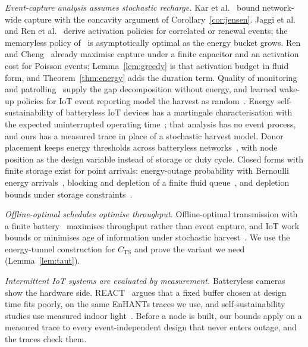 \emph{Event-capture analysis assumes stochastic recharge.} Kar et al.~\cite{kar2006ton} bound network-wide capture with the concavity argument of Corollary~\ref{cor:jensen}. Jaggi et al.~\cite{jaggi2009wn} and Ren et al.~\cite{ren2014tpds,ren2015p2p} derive activation policies for correlated or renewal events; the memoryless policy of~\cite{jaggi2009wn} is asymptotically optimal as the energy bucket grows. Ren and Cheng~\cite{ren2015p2p} already maximise capture under a finite capacitor and an activation cost for Poisson events; Lemma~\ref{lem:greedy} is that activation budget in fluid form, and Theorem~\ref{thm:energy} adds the duration term. Quality of monitoring~\cite{yau2010tosn} and patrolling~\cite{lin2013opre} supply the gap decomposition without energy, and learned wake-up policies for IoT event reporting model the harvest as random~\cite{ruizguirola2026iotj}. Energy self-sustainability of batteryless IoT devices has a martingale characterisation with the expected uninterrupted operating time~\cite{fan2025tgcn}; that analysis has no event process, and ours has a measured trace in place of a stochastic harvest model. Donor placement keeps energy thresholds across batteryless networks~\cite{hammoud2026tgcn}, with node position as the design variable instead of storage or duty cycle. Closed forms with finite storage exist for point arrivals: energy-outage probability with Bernoulli energy arrivals~\cite{ballestrin2026cl}, blocking and depletion of a finite fluid queue~\cite{deepak2026mcap}, and depletion bounds under storage constraints~\cite{yan2024iotj}.

\emph{Offline-optimal schedules optimise throughput.} Offline-optimal transmission with a finite battery~\cite{tutuncuoglu2012twc,yang2012tcom} maximises throughput rather than event capture, and IoT work bounds or minimises age of information under stochastic harvest~\cite{lei2025iotj,botirov2026iotj,hatami2025tgcn}. We use the energy-tunnel construction for $C_{\mathrm{TS}}$ and prove the variant we need (Lemma~\ref{lem:taut}).

\emph{Intermittent IoT systems are evaluated by measurement.} Batteryless cameras~\cite{desai2022camaroptera} show the hardware side. REACT~\cite{williams2024react} argues that a fixed buffer chosen at design time fits poorly, on the same EnHANTs traces we use, and self-sustainability studies use measured indoor light~\cite{mayer2024iotj}. Before a node is built, our bounds apply on a measured trace to every event-independent design that never enters outage, and the traces check them.

